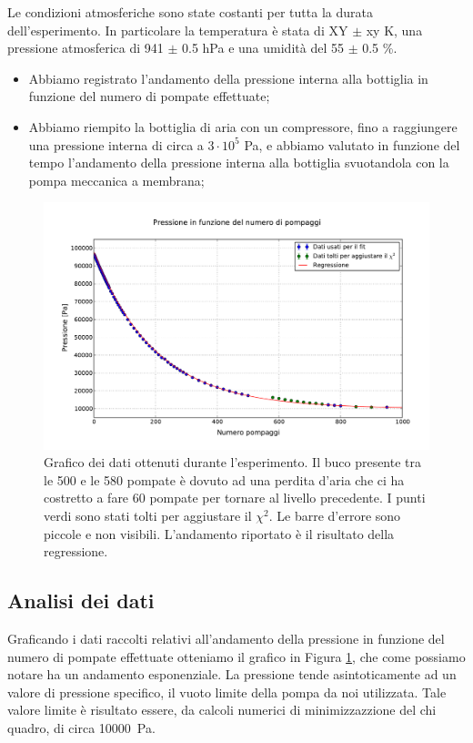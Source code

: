 Le condizioni atmosferiche sono state costanti per tutta la durata dell'esperimento. In particolare la temperatura è stata di XY $\pm$ xy \si{\kelvin}, una pressione atmosferica di 941 $\pm$ 0.5 hPa e una umidità del 55 $\pm$ 0.5 \%.

\begin{itemize}
	\item{Abbiamo registrato l'andamento della pressione interna alla bottiglia in funzione del numero di pompate effettuate;}
	\item{Abbiamo riempito la bottiglia di aria con un compressore, fino a raggiungere una pressione
	interna di circa a $3 \cdot 10^5$ \si{\Pa}, e abbiamo valutato in funzione del tempo l'andamento della pressione interna alla bottiglia svuotandola con la pompa meccanica a membrana;}
\end{itemize}

\begin{figure}[h!]
    \includegraphics[width=160mm]{graph.pdf}
    \caption{Grafico dei dati ottenuti durante l'esperimento. Il buco presente tra le 500 e le 580 pompate è dovuto ad una perdita d'aria
    che ci ha costretto a fare 60 pompate per tornare al livello precedente. I punti verdi sono stati tolti per aggiustare il $\chi^2$.
    Le barre d'errore sono piccole e non visibili. L'andamento riportato è il risultato della regressione.}
    \label{fig:graph1}
\end{figure}

\subsection{Analisi dei dati}

Graficando i dati raccolti relativi all'andamento della pressione in funzione del numero di pompate effettuate otteniamo
il grafico in Figura \ref{fig:graph1}, che come possiamo notare ha un andamento esponenziale. La pressione tende asintoticamente ad un valore di pressione specifico, il vuoto limite della pompa
da noi utilizzata. Tale valore limite è risultato essere, da calcoli numerici di minimizzazzione del chi quadro, di circa \SI{10000}{\Pa}.

